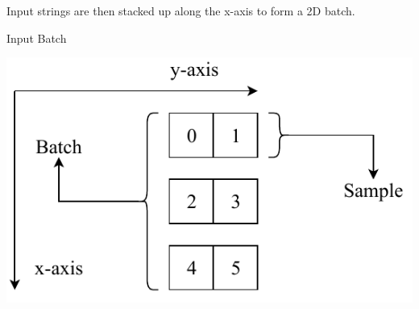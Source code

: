 \documentclass[12pt]{article}
\newcommand\tab[1][1cm]{\hspace*{#1}}
\begin{document}
\begin{tcbraster}[raster columns=2,raster rows=1,
	enhanced,size=small,fit algorithm=hybrid* ]
	\begin{tcolorbox}[frame hidden,colback=white]
		\tab Input strings are then stacked up \tab along the x-axis to form a 2D batch.
	\end{tcolorbox}
	\begin{inlinefigure}{Input Batch}
		\begin{center}
			\includegraphics[width=\textwidth]{input_final}
		\end{center}
	\end{inlinefigure}
\end{tcbraster}
\end{document}
